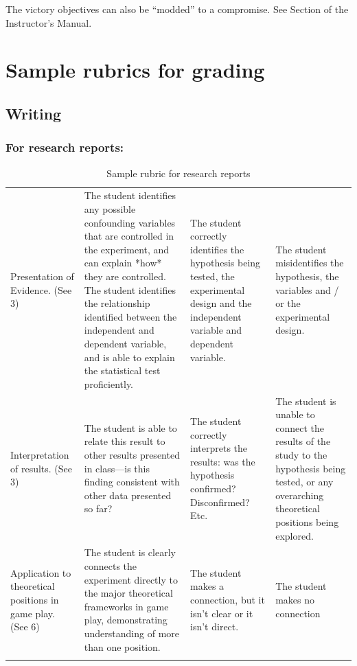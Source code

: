 \begin{refsection}
The victory objectives can also be ``modded'' to a compromise. See Section  of the Instructor's Manual.

\section{Sample rubrics for grading}
\label{samplerubricsforgrading}

\subsection{Writing}
\label{writing}

\subsubsection{For research reports:}
\label{forresearchreports:}

 \begin{longtable}[!t]{ | P{2cm} | P{5cm} | P{3.5cm} | P{3.5cm} |}
\hline
{} &  &  &  \\ \hline

Presentation of Evidence. (See  3)&
The student identifies any possible confounding variables that are controlled in the experiment, and can explain *how* they are controlled. The student identifies the relationship identified between the independent and dependent variable, and is able to explain the statistical test proficiently. & The student correctly identifies the hypothesis being tested, the experimental design and the independent variable and dependent variable.
&The student misidentifies the hypothesis, the variables and / or the experimental design. \\ \hline
Interpretation of results.  (See  3)&
The student is able to relate this result to other results presented in class---is this finding consistent with other data presented so far?&
The student correctly interprets the results: was the hypothesis confirmed? Disconfirmed? Etc.&
The student is unable to connect the results of the study to the hypothesis being tested, or any overarching theoretical positions being explored. \\ \hline
Application to theoretical positions in game play. (See  6) &
The student is clearly connects the experiment directly to the major theoretical frameworks in game play, demonstrating understanding of more than one position.&
The student makes a connection, but it isn’t clear or it isn’t direct.&
The student makes no connection \\ \hline
\caption{Sample rubric for research reports}
\label{table: writingrubric}
\end{longtable} 


\end{refsection}
